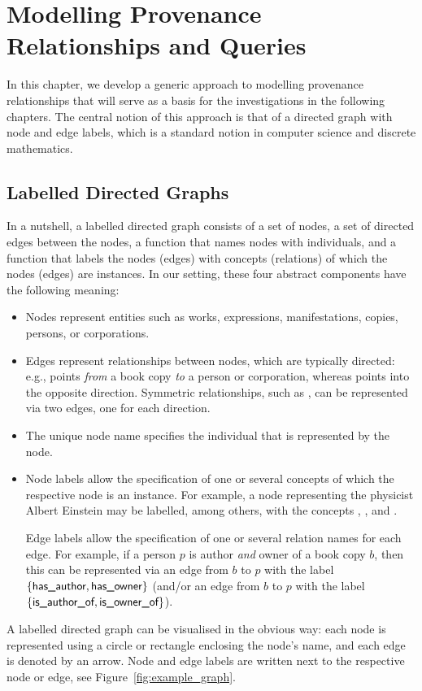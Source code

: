 
\chapter{Modelling Provenance Relationships and Queries}

In this chapter, we develop a generic approach to modelling provenance relationships
that will serve as a basis for the investigations in the following chapters.
The central notion of this approach is that of a directed graph with node and edge labels,
which is a standard notion in computer science and discrete mathematics.

\section{Labelled Directed Graphs}

In a nutshell, a labelled directed graph consists of a set of nodes, a set of directed edges between
the nodes, a function that names nodes with individuals,
and a function that labels the nodes (edges) with concepts (relations)
of which the nodes (edges) are instances.
In our setting, these four abstract components have the following meaning:
%
\begin{itemize}
  \item 
    Nodes represent entities such as works, expressions, manifestations, copies,
    persons, or corporations.
  \item 
    Edges represent relationships between nodes, which are typically directed:
    e.g.,  points \emph{from} a book copy \emph{to} a person or corporation,
    whereas  points into the opposite direction.
    Symmetric relationships, such as ,
    can be represented via two edges, one for each direction.
  \item 
    The unique node name specifies the individual that is represented by the node.
  \item 
    Node labels allow the specification of one or several concepts
    of which the respective node is an instance.
    For example, a node representing the physicist Albert Einstein
    may be labelled, among others, with the concepts , ,
    and .

    Edge labels allow the specification of one or several relation names for each edge.
    For example, if a person $p$ is author \emph{and} owner of a book copy $b$,
    then this can be represented via an edge from $b$ to $p$ with the label
    $\{\textsf{has\_author},\textsf{has\_owner}\}$
    (and/or an edge from $b$ to $p$ with the label $\{\textsf{is\_author\_of},\textsf{is\_owner\_of}\}$).
\end{itemize}
%
A labelled directed graph can be visualised in the obvious way:
each node is represented using a circle or rectangle
enclosing the node's name,
and each edge is denoted by an arrow.
Node and edge labels are written next to the respective node or edge,
see Figure~\ref{fig:example_graph}.


